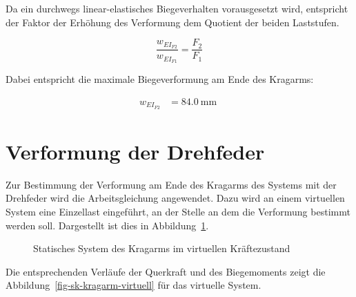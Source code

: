 \documentclass[
  11pt,
  letterpaper,
]{scrreprt}
\begin{document}
Da ein durchwegs linear-elastisches Biegeverhalten vorausgesetzt wird,
entspricht der Faktor der Erhöhung des Verformung dem Quotient der
beiden Laststufen.

\[
\frac{w_{EI_{F2}}}{w_{EI_{F1}}} = \frac{F_2}{F_1}
\]

Dabei entspricht die maximale Biegeverformung am Ende des Kragarms:

$$
\begin{aligned}
w_{EI_{F2}} &= 84.0\ \mathrm{mm} \;
\end{aligned}
$$

\section{Verformung der Drehfeder}\label{verformung-der-drehfeder}

Zur Bestimmung der Verformung am Ende des Kragarms des Systems mit der
Drehfeder wird die Arbeitsgleichung angewendet. Dazu wird an einem
virtuellen System eine Einzellast eingeführt, an der Stelle an dem die
Verformung bestimmt werden soll. Dargestellt ist dies in
Abbildung~\ref{fig-kragarm-sys-virtuell}.

\begin{figure}[H]


\caption{\label{fig-kragarm-sys-virtuell}Statisches System des Kragarms
im virtuellen Kräftezustand}

\end{figure}%

Die entsprechenden Verläufe der Querkraft und des Biegemoments zeigt die
Abbildung~\ref{fig-sk-kragarm-virtuell} für das virtuelle System.
\end{document}
